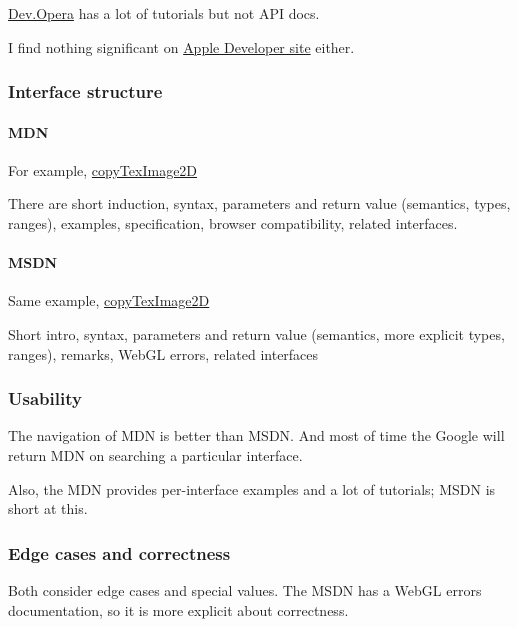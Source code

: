 \documentclass[]{article}
\begin{document}
\href{http://dev.opera.com}{Dev.Opera} has a lot of tutorials but not
API docs.

I find nothing significant on \href{https://developer.apple.com}{Apple
Developer site} either.

\subsubsection{Interface structure}\label{interface-structure}

\paragraph{MDN}\label{mdn}

For example,
\href{https://developer.mozilla.org/en-US/docs/Web/API/WebGLRenderingContext/copyTexImage2D}{copyTexImage2D}

There are short induction, syntax, parameters and return value
(semantics, types, ranges), examples, specification, browser
compatibility, related interfaces.

\paragraph{MSDN}\label{msdn}

Same example,
\href{https://msdn.microsoft.com/en-us/library/dn302380(v=vs.85).aspx}{copyTexImage2D}

Short intro, syntax, parameters and return value (semantics, more
explicit types, ranges), remarks, WebGL errors, related interfaces

\subsubsection{Usability}\label{usability}

The navigation of MDN is better than MSDN. And most of time the Google
will return MDN on searching a particular interface.

Also, the MDN provides per-interface examples and a lot of tutorials;
MSDN is short at this.

\subsubsection{Edge cases and
correctness}\label{edge-cases-and-correctness}

Both consider edge cases and special values. The MSDN has a WebGL errors
documentation, so it is more explicit about correctness.
\end{document}
